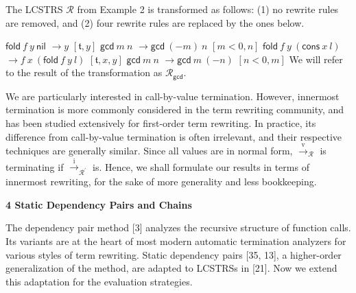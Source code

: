 The LCSTRS $\mathcal{R}$ from Example 2 is transformed as follows: (1) no rewrite rules are removed, and (2) four rewrite rules are replaced by the ones below.\par
    $\displaystyle{{{\mathsf{fold}}\ {f}}\ {y}}\ {\mathsf{nil}}$ $\displaystyle\rightarrow y$ $\displaystyle[\mathfrak{t},y]$ $\displaystyle{{\mathsf{gcd}}\ {m}}\ {n}$ $\displaystyle\rightarrow{{\mathsf{gcd}}\ {(-m)}}\ {n}$ $\displaystyle[m<0,n]$     $\displaystyle{{{\mathsf{fold}}\ {f}}\ {y}}\ {({{\mathsf{cons}}\ {x}}\ {l})}$ $\displaystyle\rightarrow{{f}\ {x}}\ {({{{\mathsf{fold}}\ {f}}\ {y}}\ {l})}$ $\displaystyle[\mathfrak{t},x,y]$ $\displaystyle{{\mathsf{gcd}}\ {m}}\ {n}$ $\displaystyle\rightarrow{{\mathsf{gcd}}\ {m}}\ {(-n)}$ $\displaystyle[n<0,m]$    
We will refer to the result of the transformation as $\mathcal{R}_{\mathsf{gcd}}$.\par
 
 
 
 
We are particularly interested in call-by-value termination. However, innermost termination is more commonly considered in the term rewriting community, and has been studied extensively for first-order term rewriting. In practice, its difference from call-by-value termination is often irrelevant, and their respective techniques are generally similar. Since all values are in normal form, $\xrightarrow{\scriptscriptstyle\mathrm{v}}_{\mathcal{R}}$ is terminating if $\xrightarrow{\scriptscriptstyle\mathrm{i}}_{\mathcal{R}^{\prime}}$ is. Hence, we shall formulate our results in terms of innermost rewriting, for the sake of more generality and less bookkeeping.\par
 
 


 
\par\medskip\noindent\textbf{4 Static Dependency Pairs and Chains}\par
 
 
The dependency pair method [3] analyzes the recursive structure of function calls. Its variants are at the heart of most modern automatic termination analyzers for various styles of term rewriting. Static dependency pairs [35, 13], a higher-order generalization of the method, are adapted to LCSTRSs in [21]. Now we extend this adaptation for the evaluation strategies.\par
 
